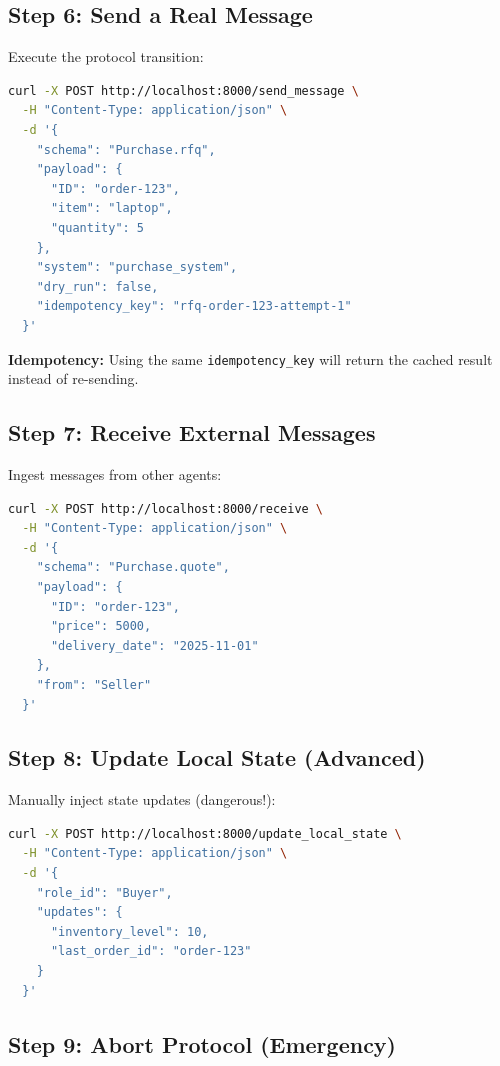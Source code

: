 \documentclass[11pt,a4paper]{article}
\begin{document}
\subsection{Step 6: Send a Real Message}

Execute the protocol transition:

\begin{lstlisting}[language=bash]
curl -X POST http://localhost:8000/send_message \
  -H "Content-Type: application/json" \
  -d '{
    "schema": "Purchase.rfq",
    "payload": {
      "ID": "order-123",
      "item": "laptop",
      "quantity": 5
    },
    "system": "purchase_system",
    "dry_run": false,
    "idempotency_key": "rfq-order-123-attempt-1"
  }'
\end{lstlisting}

\textbf{Idempotency:} Using the same \texttt{idempotency\_key} will return the cached result instead of re-sending.

\subsection{Step 7: Receive External Messages}

Ingest messages from other agents:

\begin{lstlisting}[language=bash]
curl -X POST http://localhost:8000/receive \
  -H "Content-Type: application/json" \
  -d '{
    "schema": "Purchase.quote",
    "payload": {
      "ID": "order-123",
      "price": 5000,
      "delivery_date": "2025-11-01"
    },
    "from": "Seller"
  }'
\end{lstlisting}

\subsection{Step 8: Update Local State (Advanced)}

Manually inject state updates (dangerous!):

\begin{lstlisting}[language=bash]
curl -X POST http://localhost:8000/update_local_state \
  -H "Content-Type: application/json" \
  -d '{
    "role_id": "Buyer",
    "updates": {
      "inventory_level": 10,
      "last_order_id": "order-123"
    }
  }'
\end{lstlisting}

\subsection{Step 9: Abort Protocol (Emergency)}
\end{document}
